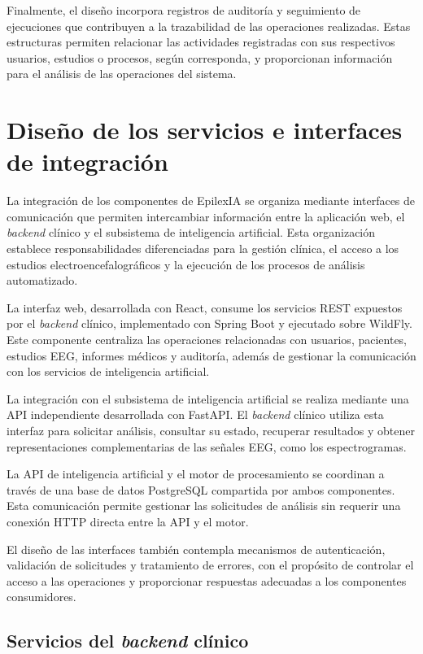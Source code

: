 Finalmente, el diseño incorpora registros de auditoría
y seguimiento de ejecuciones que contribuyen a la
trazabilidad de las operaciones realizadas. Estas
estructuras permiten relacionar las actividades registradas
con sus respectivos usuarios, estudios o procesos, según
corresponda, y proporcionan información para el análisis
de las operaciones del sistema.


\section{Diseño de los servicios e interfaces de integración}
\label{sec:diseno-servicios-integracion}

La integración de los componentes de EpilexIA se organiza
mediante interfaces de comunicación que permiten intercambiar
información entre la aplicación web, el \textit{backend} clínico y
el subsistema de inteligencia artificial. Esta organización
establece responsabilidades diferenciadas para la gestión
clínica, el acceso a los estudios electroencefalográficos
y la ejecución de los procesos de análisis automatizado.

La interfaz web, desarrollada con React, consume los servicios
REST expuestos por el \textit{backend} clínico, implementado con
Spring Boot y ejecutado sobre WildFly. Este componente
centraliza las operaciones relacionadas con usuarios,
pacientes, estudios EEG, informes médicos y auditoría,
además de gestionar la comunicación con los servicios
de inteligencia artificial.

La integración con el subsistema de inteligencia artificial
se realiza mediante una API independiente desarrollada
con FastAPI. El \textit{backend} clínico utiliza esta interfaz
para solicitar análisis, consultar su estado, recuperar
resultados y obtener representaciones complementarias
de las señales EEG, como los espectrogramas.

La API de inteligencia artificial y el motor de procesamiento
se coordinan a través de una base de datos PostgreSQL
compartida por ambos componentes. Esta comunicación permite
gestionar las solicitudes de análisis sin requerir una
conexión HTTP directa entre la API y el motor.

El diseño de las interfaces también contempla mecanismos
de autenticación, validación de solicitudes y tratamiento
de errores, con el propósito de controlar el acceso a
las operaciones y proporcionar respuestas adecuadas
a los componentes consumidores.


\subsection{Servicios del \textit{backend} clínico}
\label{subsec:servicios-backend-principal}

